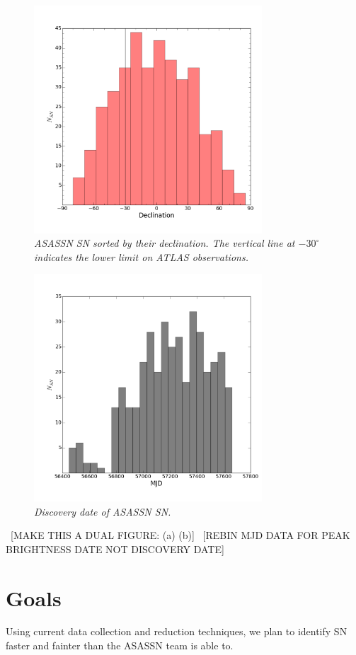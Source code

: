\documentclass[aps,prb,twocolumn,superscriptaddress]{revtex4-1}
\begin{document}
\begin{figure}[H]%
  \begin{center}
\centerline{\includegraphics[width=3.35in]{figures/dec_histo_step10.png}}
\caption{\it \small{ASASSN SN sorted by their declination. The vertical line at $-30^{\circ}$ indicates the lower limit on ATLAS observations. \label{fig:asn_dec}}}
  \end{center}
\end{figure}
\begin{figure}[H]%
  \begin{center}
\centerline{\includegraphics[width=3.35in]{figures/mjd_histo_step50.png}}
\caption{\it \small{Discovery date of ASASSN SN. \label{fig:asn_mjd}}}
  \end{center}
\end{figure}
~[MAKE THIS A DUAL FIGURE: (a) (b)]
~[REBIN MJD DATA FOR PEAK BRIGHTNESS DATE NOT DISCOVERY DATE]

\section{Goals}
Using current data collection and reduction techniques, we plan to identify SN faster and fainter than the 
ASASSN team is able to.
\end{document}
